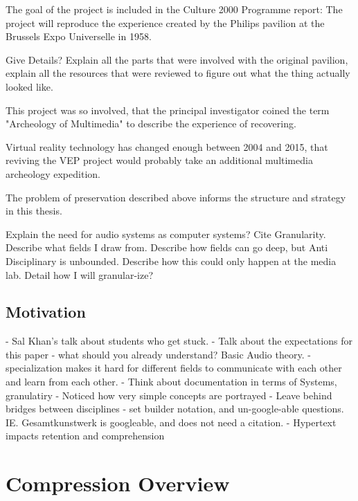 The goal of the project is included in the Culture 2000 Programme
report: The project will reproduce the experience created by the
Philips pavilion at the Brussels Expo Universelle in 1958.

Give Details? Explain all the parts that were involved with the
original pavilion, explain all the resources that were reviewed to
figure out what the thing actually looked like.

This project was so involved, that the principal investigator coined
the term "Archeology of Multimedia" to describe the experience of
recovering.

Virtual reality technology has changed enough between 2004 and 2015,
that reviving the VEP project would probably take an additional
multimedia archeology expedition.

The problem of preservation described above informs the structure and
strategy in this thesis. 

Explain the need for audio systems as computer systems? Cite
Granularity. Describe what fields I draw from. Describe how fields can
go deep, but Anti Disciplinary is unbounded. Describe how this could
only happen at the media lab. Detail how I will granular-ize?

\section{Motivation}
\label{sec:motivation}

  - Sal Khan's talk about students who get stuck. 
  - Talk about the expectations for this paper - what should you
    already understand? Basic Audio theory. 
  - specialization makes it hard for different fields to communicate
  with each other and learn from each other.
  - Think about documentation in terms of Systems, granulatiry
  - Noticed how very simple concepts are portrayed 
  - Leave behind bridges between disciplines
  - set builder notation, and un-google-able
  questions. IE. Gesamtkunstwerk is googleable, and does not need a
  citation.
  - Hypertext impacts retention and comprehension



\chapter{Compression Overview}
\label{cha:compression-overview}

